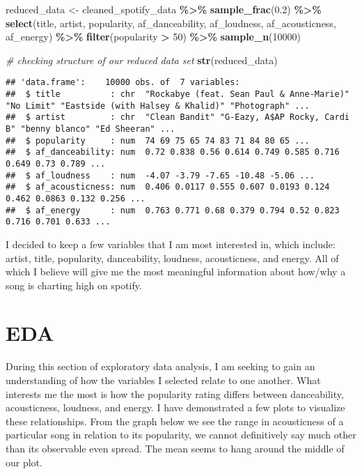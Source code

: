 \documentclass[
]{article}
\newenvironment{Shaded}{\begin{snugshade}}{\end{snugshade}}
\newcommand{\CommentTok}[1]{\textcolor[rgb]{0.56,0.35,0.01}{\textit{#1}}}
\newcommand{\DecValTok}[1]{\textcolor[rgb]{0.00,0.00,0.81}{#1}}
\newcommand{\FloatTok}[1]{\textcolor[rgb]{0.00,0.00,0.81}{#1}}
\newcommand{\FunctionTok}[1]{\textcolor[rgb]{0.13,0.29,0.53}{\textbf{#1}}}
\newcommand{\NormalTok}[1]{#1}
\newcommand{\OtherTok}[1]{\textcolor[rgb]{0.56,0.35,0.01}{#1}}
\newcommand{\SpecialCharTok}[1]{\textcolor[rgb]{0.81,0.36,0.00}{\textbf{#1}}}
\begin{document}
\begin{Shaded}
\begin{Highlighting}[]
\NormalTok{reduced\_data }\OtherTok{\textless{}{-}}\NormalTok{ cleaned\_spotify\_data }\SpecialCharTok{\%\textgreater{}\%} \FunctionTok{sample\_frac}\NormalTok{(}\FloatTok{0.2}\NormalTok{) }\SpecialCharTok{\%\textgreater{}\%} \FunctionTok{select}\NormalTok{(title, artist, popularity, af\_danceability, af\_loudness, af\_acousticness, af\_energy) }\SpecialCharTok{\%\textgreater{}\%} \FunctionTok{filter}\NormalTok{(popularity }\SpecialCharTok{\textgreater{}} \DecValTok{50}\NormalTok{) }\SpecialCharTok{\%\textgreater{}\%}  \FunctionTok{sample\_n}\NormalTok{(}\DecValTok{10000}\NormalTok{)}

\CommentTok{\# checking structure of our reduced data set}
\FunctionTok{str}\NormalTok{(reduced\_data)}
\end{Highlighting}
\end{Shaded}

\begin{verbatim}
## 'data.frame':    10000 obs. of  7 variables:
##  $ title          : chr  "Rockabye (feat. Sean Paul & Anne-Marie)" "No Limit" "Eastside (with Halsey & Khalid)" "Photograph" ...
##  $ artist         : chr  "Clean Bandit" "G-Eazy, A$AP Rocky, Cardi B" "benny blanco" "Ed Sheeran" ...
##  $ popularity     : num  74 69 75 65 74 83 71 84 80 65 ...
##  $ af_danceability: num  0.72 0.838 0.56 0.614 0.749 0.585 0.716 0.649 0.73 0.789 ...
##  $ af_loudness    : num  -4.07 -3.79 -7.65 -10.48 -5.06 ...
##  $ af_acousticness: num  0.406 0.0117 0.555 0.607 0.0193 0.124 0.462 0.0863 0.132 0.256 ...
##  $ af_energy      : num  0.763 0.771 0.68 0.379 0.794 0.52 0.823 0.716 0.701 0.633 ...
\end{verbatim}

I decided to keep a few variables that I am most interested in, which
include: artist, title, popularity, danceability, loudness,
acousticness, and energy. All of which I believe will give me the most
meaningful information about how/why a song is charting high on spotify.

\hypertarget{eda}{%
\section{\texorpdfstring{\textbf{EDA}}{EDA}}\label{eda}}

During this section of exploratory data analysis, I am seeking to gain
an understanding of how the variables I selected relate to one another.
What interests me the most is how the popularity rating differs between
danceability, acousticness, loudness, and energy. I have demonstrated a
few plots to visualize these relationships. From the graph below we see
the range in acousticness of a particular song in relation to its
popularity, we cannot definitively say much other than its observable
even spread. The mean seems to hang around the middle of our plot.
\end{document}
